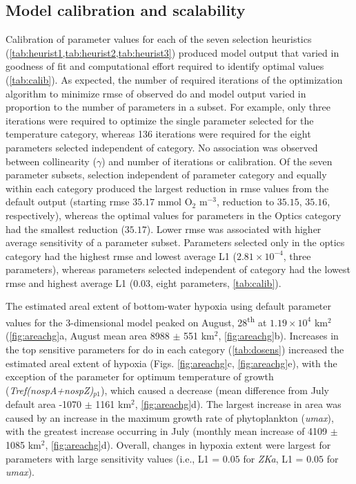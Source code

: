 \documentclass[review]{elsarticle}\usepackage[]{graphicx}\usepackage[]{color}
\begin{document}
\subsection{Model calibration and scalability}



Calibration of parameter values for each of the seven selection heuristics (\cref{tab:heurist1,tab:heurist2,tab:heurist3})  produced model output that varied in goodness of fit and computational effort required to identify optimal values (\cref{tab:calib}).  As expected, the number of required iterations of the optimization algorithm to minimize \ac{rmse} of observed \ac{do} and model output varied in proportion to the number of parameters in a subset.  For example, only three iterations were required to optimize the single parameter selected for the temperature category, whereas 136 iterations were required for the eight parameters selected independent of category.  No association was observed between collinearity ($\gamma$) and number of iterations or calibration.  Of the seven parameter subsets, selection independent of parameter category and equally within each category produced the largest reduction in \ac{rmse} values from the default output (starting \ac{rmse} $35.17$ mmol O$_2$ m$^{-3}$, reduction to $35.15$, $35.16$, respectively), whereas the optimal values for parameters in the Optics category had the smallest reduction ($35.17$).  Lower \ac{rmse} was associated with higher average sensitivity of a parameter subset.  Parameters selected only in the optics category had the highest \ac{rmse} and lowest average L1 ($2.81\times 10^{-4}$, three parameters), whereas parameters selected independent of category had the lowest \ac{rmse} and highest average L1 ($0.03$, eight parameters, \cref{tab:calib}). 



The estimated areal extent of bottom-water hypoxia using default parameter values for the 3-dimensional model peaked on August, 28\textsuperscript{th} at $1.19\times 10^{4}$ km$^2$ (\cref{fig:areachg}a, August mean area 8988 $\pm$ 551 km$^2$, \cref{fig:areachg}b). Increases in the top sensitive parameters for \ac{do} in each category (\cref{tab:dosens}) increased the estimated areal extent of hypoxia (Figs. \ref{fig:areachg}c, \ref{fig:areachg}e), with the exception of the parameter for optimum temperature of growth (\textit{Tref(nospA+nospZ)$_{p1}$}), which caused a decrease (mean difference from July default area -1070 $\pm$ 1161 km$^2$, \cref{fig:areachg}d).  The largest increase in area was caused by an increase in the maximum growth rate of phytoplankton (\textit{umax}), with the greatest increase occurring in July (monthly mean increase of 4109 $\pm$ 1085 km$^2$, \cref{fig:areachg}d).  Overall, changes in hypoxia extent were largest for parameters with large sensitivity values (i.e., L1 = $0.05$ for \textit{ZKa}, L1 = $0.05$ for \textit{umax}).
\end{document}

